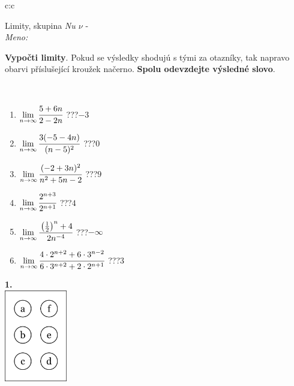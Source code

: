\documentclass[10pt]{report}
\begin{document}
\begin{tabular}{c:c}
\begin{minipage}[c][104.5mm][t]{0.5\linewidth}
\begin{center}
\vspace{7mm}
{\huge Limity, skupina \textit{Nu $\nu$} -}\\[5mm]
\textit{Meno:}\phantom{xxxxxxxxxxxxxxxxxxxxxxxxxxxxxxxxxxxxxxxxxxxxxxxxxxxxxxxxxxxxxxxxx}\\[5mm]
\begin{minipage}{0.95\linewidth}
\begin{center}
\textbf{Vypočti limity}. Pokud se výsledky shodujú s tými za otazníky, tak napravo\\obarvi příslušející kroužek načerno. \textbf{Spolu odevzdejte výsledné slovo}.
\end{center}
\end{minipage}
\\[1mm]
\begin{minipage}{0.79\linewidth}
\begin{center}
\begin{varwidth}{\linewidth}
\begin{enumerate}
\normalsize
\item $\lim\limits_{n\to\infty}\cfrac{5+6n}{2-2n}$\quad \dotfill\; ???\;\dotfill \quad $-3$
\item $\lim\limits_{n\to\infty}\cfrac{3(-5-4n)}{(n-5)^2}$\quad \dotfill\; ???\;\dotfill \quad $0$
\item $\lim\limits_{n\to\infty}\cfrac{(-2+3n)^2}{n^2+5n-2}$\quad \dotfill\; ???\;\dotfill \quad $9$
\item $\lim\limits_{n\to\infty}\cfrac{2^{n+3}}{2^{n+1}}$\quad \dotfill\; ???\;\dotfill \quad $4$
\item $\lim\limits_{n\to\infty}\cfrac{\left(\frac{1}{2}\right)^n +4}{2n^{-4}}$\quad \dotfill\; ???\;\dotfill \quad $-\infty$
\item $\lim\limits_{n\to\infty}\cfrac{4\cdot 2^{n+2}+6\cdot 3^{n-2}}{6\cdot 3^{n+2}+2\cdot 2^{n+1}}$\quad \dotfill\; ???\;\dotfill \quad $3$
\end{enumerate}
\end{varwidth}
\end{center}
\end{minipage}
\begin{minipage}{0.20\linewidth}
\begin{center}
{\Huge\bfseries 1.} \\[2mm]
\includegraphics[height=40mm]{../images/braille.png}

\end{center}
\end{minipage}
\end{center}
\end{minipage}
\end{tabular}
\end{document}
